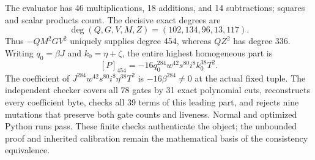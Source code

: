 The evaluator has 46 multiplications, 18 additions, and 14 subtractions;
squares and scalar products count. The decisive exact degrees are
\[
 \deg(Q,G,V,M,Z)=(102,134,96,13,117).
\]
Thus \(-QM^2GV^2\) uniquely supplies degree 454, whereas
\(QZ^2\) has degree 336. Writing \(q_0=\beta J\) and
\(k_0=\eta+\zeta\), the entire highest homogeneous part is
\[
 [P]_{454}=-16q_0^{284}w^{42}s^{80}i^8k_0^{38}T^2.
\]
The coefficient of \(J^{284}w^{42}s^{80}i^8\eta^{38}T^2\) is
\(-16\beta^{284}\ne0\) at the actual fixed tuple.
The independent checker covers all 78 gates by 31 exact polynomial cuts,
reconstructs every coefficient byte, checks all 39 terms of this leading
part, and rejects nine mutations that preserve both gate counts and
liveness. Normal and optimized Python runs pass. These finite checks
authenticate the object; the unbounded proof and inherited calibration
remain the mathematical basis of the consistency equivalence.
